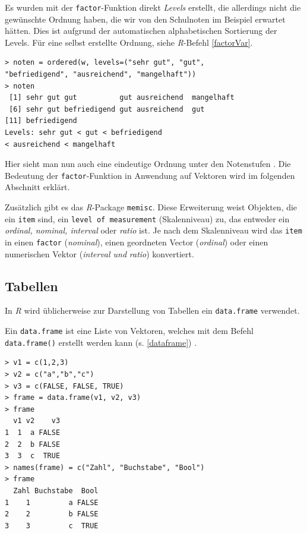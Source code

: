 \documentclass[a4paper, 12pt]{report} %
\begin{document}
Es wurden mit der \texttt{factor}-Funktion direkt \textit{Levels} erstellt, die allerdings nicht die gewünschte Ordnung haben, die wir von den Schulnoten im Beispiel erwartet hätten. Dies ist aufgrund der automatischen alphabetischen Sortierung der Levels. Für eine selbst erstellte Ordnung, siehe \textit{R}-Befehl \ref{factorVar}. 

\lstset{language=R}
\begin{lstlisting}[frame=single,caption={Ordnen einer selbsterstellten \texttt{factor Variable}}]
> noten = ordered(w, levels=("sehr gut", "gut", 
"befriedigend", "ausreichend", "mangelhaft"))
> noten
 [1] sehr gut gut          gut ausreichend  mangelhaft  
 [6] sehr gut befriedigend gut ausreichend  gut         
[11] befriedigend
Levels: sehr gut < gut < befriedigend 
< ausreichend < mangelhaft
\end{lstlisting}
\label{factorVar}

Hier sieht man nun auch eine eindeutige Ordnung unter den Notenstufen \cite{factorVariables}. Die Bedeutung der \texttt{factor}-Funktion in Anwendung auf Vektoren wird im folgenden Abschnitt erklärt. 

Zusätzlich gibt es das \textit{R}-Package \texttt{memisc}. Diese Erweiterung weist Objekten, die ein \texttt{item} sind, ein \texttt{level of measurement} (Skalenniveau) zu, das entweder ein \textit{ordinal, nominal, interval} oder \textit{ratio} ist. Je nach dem Skalenniveau wird das \texttt{item} in einen \texttt{factor} (\textit{nominal}), einen geordneten Vector (\textit{ordinal}) oder einen numerischen Vektor (\textit{interval und} \textit{ratio}) konvertiert. 

\subsection{Tabellen}

In \textit{R} wird üblicherweise zur Darstellung von Tabellen ein \texttt{data.frame} verwendet. 

Ein \texttt{data.frame} ist eine Liste von Vektoren, welches mit dem Befehl \texttt{data.frame()} erstellt werden kann (s. \ref{dataframe}) \cite{dataFrame}.

\lstset{language=R}
\begin{lstlisting}[frame=single,caption={\texttt{data.frame} aus 3 Vektoren}]
> v1 = c(1,2,3)
> v2 = c("a","b","c")
> v3 = c(FALSE, FALSE, TRUE)
> frame = data.frame(v1, v2, v3)
> frame
  v1 v2    v3
1  1  a FALSE
2  2  b FALSE
3  3  c  TRUE
> names(frame) = c("Zahl", "Buchstabe", "Bool")
> frame
  Zahl Buchstabe  Bool
1    1         a FALSE
2    2         b FALSE
3    3         c  TRUE

\end{lstlisting}
\label{dataframe}
\end{document}
